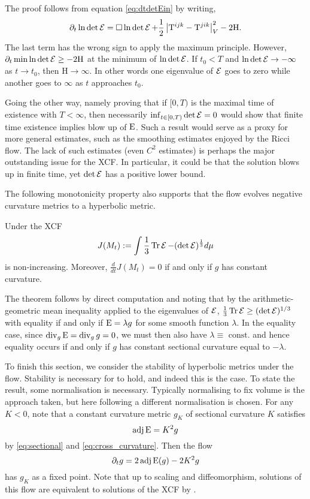 \documentclass[a4paper,12pt]{amsart}
\begin{document}
The proof follows from equation \eqref{eq:dtdetEin} by writing,
\[
\partial_t \ln \det \operatorname{\mathcal{E}} = \Box \ln \det \operatorname{\mathcal{E}} + \frac{1}{2}\left\lvert{\mathrm{T}^{ijk} - \mathrm{T}^{jik}}\right\rvert_V^2- 2 \mathrm{H}.
\]
The last term has the wrong sign to apply the maximum principle. However, \(\partial_t \min \ln \det\operatorname{\mathcal{E}} \geq -2 \mathrm{H}\) at the minimum of \(\ln \det\operatorname{\mathcal{E}}\). If $t_0<T$ and \(\ln\det\operatorname{\mathcal{E}} \to -\infty\) as $t\to t_0$, then \(\mathrm{H} \to \infty\). In other words one eigenvalue of \(\operatorname{\mathcal{E}}\) goes to zero while another goes to \(\infty\) as $t$ approaches $t_0$.

Going the other way, namely proving that if \([0, T)\) is the maximal time of existence with \(T < \infty\), then necessarily \(\inf_{t \in [0, T)} \det \operatorname{\mathcal{E}} = 0\) would show that finite time existence implies blow up of \(\operatorname{E}\). Such a result would serve as a proxy for more general estimates, such as the smoothing estimates enjoyed by the Ricci flow. The lack of such estimates (even \(C^2\) estimates) is perhaps the major outstanding issue for the XCF. In particular, it could be that the solution blows up in finite time, yet \(\det \operatorname{\mathcal{E}}\) has a positive lower bound.

The following monotonicity property also supports  that the flow evolves negative curvature metrics to a hyperbolic metric.

\begin{thm}[{\cite[Theorem 8]{MR2055396}}]
\label{thm:hyperbolicity}
Under the XCF
\[J(M_t):=\int \frac{1}{3} \operatorname{Tr} \operatorname{\mathcal{E}} - (\det\operatorname{\mathcal{E}})^{\frac{1}{3}}d\mu\]
is non-increasing. Moreover, \(\frac{d}{dt}J(M_t) = 0\) if and only if $g$ has constant curvature.
\end{thm}

The theorem follows by direct computation and noting that by the arithmetic-geometric mean inequality applied to the eigenvalues of \(\operatorname{\mathcal{E}}\), \(\tfrac{1}{3} \operatorname{Tr}\operatorname{\mathcal{E}} \geq (\det \operatorname{\mathcal{E}})^{1/3}\) with equality if and only if \(\operatorname{E} = \lambda g\) for some smooth function \(\lambda\). In the equality case, since \(\operatorname{div}_g \operatorname{E} = \operatorname{div}_g g = 0\), we must then also have \(\lambda \equiv \text{ const.}\) and hence equality occurs if and only if \(g\) has constant sectional curvature equal to \(-\lambda\).

To finish this section, we consider the stability of hyperbolic metrics under the flow. Stability is necessary for  to hold, and indeed this is the case. To state the result, some normalisation is necessary. Typically normalising to fix volume is the approach taken, but here following \cite{MR2448593} a different normalisation is chosen. For any \(K < 0\), note that a constant curvature metric \(g_K\) of sectional curvature \(K\) satisfies
\[
\operatorname{adj}\operatorname{E} = K^2 g
\]
by \eqref{eq:sectional} and \eqref{eq:cross_curvature}. Then the flow
\[
\partial_t g = 2\operatorname{adj}\operatorname{E}(g) - 2K^2 g
\]
has \(g_K\) as a fixed point. Note that up to scaling and diffeomorphism, solutions of this flow are equivalent to solutions of the XCF by \cite[Lemma 1]{MR2448593}.
\end{document}
